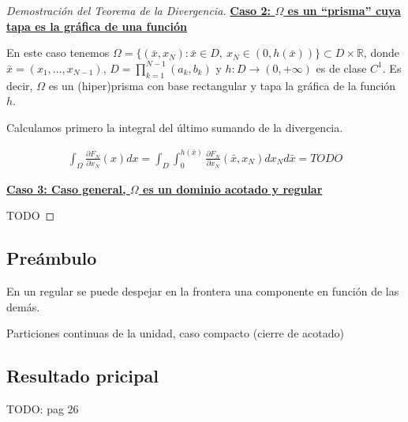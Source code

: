 \documentclass[12pt,spanish]{article}
\theoremstyle{definition}
\theoremstyle{remark}
\begin{document}
\begin{proof}[Demostración del Teorema de la Divergencia]
	\underline{\textbf{Caso 2: $\Omega$ es un ``prisma'' cuya tapa es la gráfica de una función}}
	
	En este caso tenemos $\Omega=\{(\bar{x},x_N):\bar{x}\in D, \ x_N\in (0,h(\bar{x}))\}\subset D\times\mathbb{R}$, donde $\bar{x}=(x_1,\ldots,x_{N-1})$, $\displaystyle{D=\prod_{k=1}^{N-1}(a_k,b_k)}$ y $h:D\rightarrow(0,+\infty)$ es de clase $C^1$.
	Es decir, $\Omega$ es un (hiper)prisma con base rectangular y tapa la gráfica de la función $h$.
	
	Calculamos primero la integral del último sumando de la divergencia.
	
	\begin{align*}
	\int_\Omega\frac{\partial F_N}{\partial x_N}(x)dx= \int_D\int_0^{h(\bar{x})}\frac{\partial F_N}{\partial x_N}(\bar{x},x_N)d x_N d\bar{x} = TODO
	\end{align*}
	
	\underline{\textbf{Caso 3: Caso general, $\Omega$ es un dominio acotado y regular}}
	
	TODO
	
\end{proof}

\subsection{Preámbulo}

En un regular se puede despejar en la frontera una componente en función de las demás.

Particiones continuas de la unidad, caso compacto (cierre de acotado)

\subsection{Resultado pricipal}

TODO: pag 26
\end{document}
